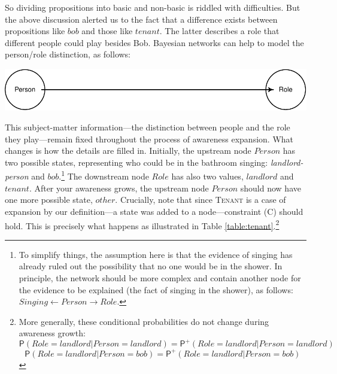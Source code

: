 \documentclass[
  11pt,
  dvipsnames,enabledeprecatedfontcommands]{scrartcl}
\newcommand{\pr}[1]{\ensuremath{\mathsf{P}(#1)}}
\newcommand{\ppr}[2]{\ensuremath{\mathsf{P}^{#1}(#2)}}
\begin{document}
So dividing propositions into basic and non-basic is riddled with
difficulties. But the above discussion alerted us to the fact that a
difference exists between propositions like \(bob\) and those like
\(tenant\). The latter describes a role that different people could play
besides Bob. Bayesian networks can help to model the person/role
distinction, as follows:

\begin{center}\includegraphics[width=0.5\linewidth,height=0.3\textheight]{ReplyToSteeleStefansson5_files/figure-latex/tenantsDAG-new-1} \end{center}

\noindent This subject-matter information---the distinction between
people and the role they play---remain fixed throughout the process of
awareness expansion. What changes is how the details are filled in.
Initially, the upstream node \(Person\) has two possible states,
representing who could be in the bathroom singing:
\textit{landlord-person} and \(bob\).\footnote{To simplify things, the
  assumption here is that the evidence of singing has already ruled out
  the possibility that no one would be in the shower. In principle, the
  network should be more complex and contain another node for the
  evidence to be explained (the fact of singing in the shower), as
  follows:
  \(\textit{Singing}\leftarrow\textit{Person}\rightarrow \textit{Role}\).}
The downstream node \(Role\) has also two values, \(landlord\) and
\(tenant\). After your awareness grows, the upstream node \(Person\)
should now have one more possible state, \(other\). Crucially, note that
since \textsc{Tenant} is a case of expansion by our definition---a state
was added to a node---constraint (C) should hold. This is precisely what
happens as illustrated in Table \ref{table:tenant}.\footnote{More
  generally, these conditional probabilities do not change during
  awareness growth:
  \[\pr{\textit{Role}=\textit{landlord} \vert \textit{Person}=\textit{landlord}}=
  \ppr{+}{\textit{Role}=\textit{landlord} \vert \textit{Person}=\textit{landlord}}\]
  \[\pr{\textit{Role}=\textit{landlord} \vert \textit{Person}=\textit{bob}}=
  \ppr{+}{\textit{Role}=\textit{landlord} \vert \textit{Person}=\textit{bob}}\]}
\end{document}
